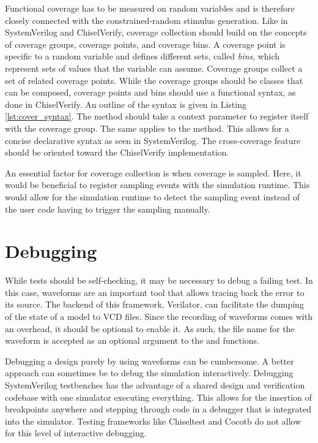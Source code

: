 Functional coverage has to be measured on random variables and is therefore closely connected with the
constrained-random stimulus generation. Like in SystemVerilog and ChiselVerify, coverage collection should build on
the concepts of coverage groups, coverage points, and coverage bins. A coverage point is specific to a random variable
and defines different sets, called \textit{bins}, which represent sets of values that the variable can assume. Coverage groups collect a set
of related coverage points. While the coverage groups should be classes that can be composed, coverage
points and bins should use a functional syntax, as done in ChiselVerify. An outline of the syntax is given in
Listing \ref{lst:cover_syntax}. The  method should take a context parameter to register
itself with the coverage group. The same applies to the  method. This allows for a concise declarative
syntax as seen in SystemVerilog. The cross-coverage feature should be oriented toward the ChiselVerify implementation.

An essential factor for coverage collection is when coverage is sampled. Here, it would be beneficial to
register sampling events with the simulation runtime. This would allow for the simulation runtime to detect the
sampling event instead of the user code having to trigger the sampling manually.

\section{Debugging} %

While tests should be self-checking, it may be necessary to debug a failing test. In this case, waveforms are an
important tool that allows tracing back the error to its source. The backend of this framework, Verilator, can facilitate the dumping of the
state of a model to VCD files. Since the recording of waveforms comes with an overhead, it should be optional to
enable it. As such, the file name for the waveform is accepted as an optional argument to the  and
 functions.

Debugging a design purely by using waveforms can be cumbersome. A better approach can sometimes be to debug the simulation
interactively. Debugging SystemVerilog testbenches has the advantage of a shared design and verification codebase with one simulator executing everything. This allows for the insertion of breakpoints anywhere and stepping through code
in a debugger that is integrated into the simulator. Testing frameworks like Chiseltest and Cocotb do not allow for
this level of interactive debugging. 

